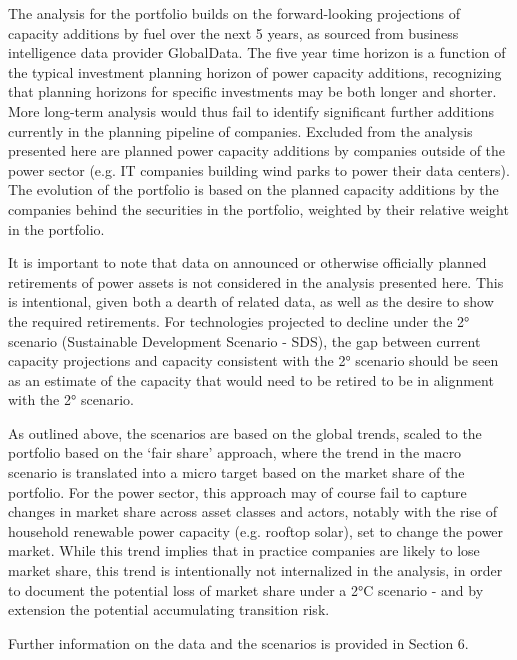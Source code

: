 \documentclass[10pt,table,a4]{article}\usepackage[]{graphicx}\usepackage[]{color}
\begin{document}
	
	\begin{multicols}{2}
		
		The analysis for the portfolio builds on the forward-looking projections of capacity additions by fuel over the next 5 years, as sourced from business intelligence data provider GlobalData. The five year time horizon is a function of the typical investment planning horizon of power capacity additions, recognizing that planning horizons for specific investments may be both longer and shorter. More long-term analysis would thus fail to identify significant further additions currently in the planning pipeline of companies. Excluded from the analysis presented here are planned power capacity additions by companies outside of the power sector (e.g. IT companies building wind parks to power their data centers). The evolution of the portfolio is based on the planned capacity additions by the companies behind the securities in the portfolio, weighted by their relative weight in the portfolio. 
		
		It is important to note that data on announced or otherwise officially planned retirements of power assets is not considered in the analysis presented here. This is intentional, given both a dearth of related data, as well as the desire to show the required retirements. For technologies projected to decline under the 2° scenario (Sustainable Development Scenario - SDS), the gap between current capacity projections and capacity consistent with the 2° scenario should be seen as an estimate of the capacity that would need to be retired to be in alignment with the 2° scenario. 
		
		As outlined above, the scenarios are based on the global trends, scaled to the portfolio based on the `fair share' approach, where the trend in the macro scenario is translated into a micro target based on the market share of the portfolio. For the power sector, this approach may of course fail to capture changes in market share across asset classes and actors, notably with the rise of household renewable power capacity (e.g. rooftop solar), set to change the power market. While this trend implies that in practice companies are likely to lose market share, this trend is intentionally not internalized in the analysis, in order to document the potential loss of market share under a 2°C scenario - and by extension the potential accumulating transition risk.
		
		Further information on the data and the scenarios is provided in Section 6. 
		

\end{multicols}
\end{document}
